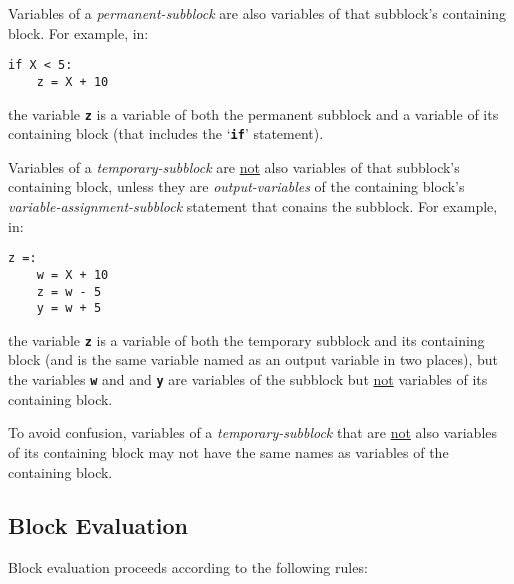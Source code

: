 \documentclass[12pt]{article}
\newcommand{\TT}[1]{{\tt \bfseries #1}}
\newenvironment{indpar}[1][0.3in]%
	{\begin{list}{}%
		     {\setlength{\itemsep}{0in}%
		      \setlength{\topsep}{0in}%
		      \setlength{\parsep}{1ex}%
		      \setlength{\labelwidth}{#1}%
		      \setlength{\leftmargin}{#1}%
		      \addtolength{\leftmargin}{\labelsep}}%
	 \item}%
	{\end{list}}
\begin{document}
Variables of a {\em permanent-subblock} are also variables of
that subblock's containing block.  For example, in:
\begin{indpar}[1in]\begin{verbatim}
if X < 5:
    z = X + 10
\end{verbatim}\end{indpar}
the variable \TT{z} is a variable of both the permanent subblock and
a variable of its containing block (that includes the `\TT{if}' statement).

Variables of a {\em temporary-subblock} are \underline{not}
also variables of that subblock's containing block, unless they
are {\em output-variables} of the containing block's
{\em variable-assignment-subblock} statement that conains the
subblock.  For example, in:
\begin{indpar}[1in]\begin{verbatim}
z =:
    w = X + 10
    z = w - 5
    y = w + 5
\end{verbatim}\end{indpar}
the variable \TT{z} is a variable of both the temporary subblock
and its containing block (and is the same variable named as an
output variable in two places), but the variables \TT{w} and 
and \TT{y} are variables of the subblock but \underline{not}
variables of its containing block.

To avoid confusion, variables of a {\em temporary-subblock}
that are \underline{not} also variables of its containing
block may not have the same names as variables of the containing block.

\subsection{Block Evaluation}
\label{BLOCK-EVALUATION}

Block evaluation proceeds according to the following rules:
\end{document}
